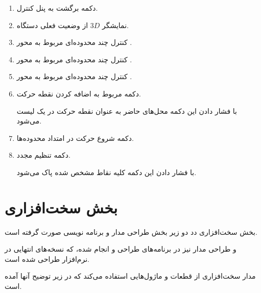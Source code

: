 \documentclass[a4paper,12pt]{report}
\begin{document}
	\begin{enumerate}[nosep]
		\item
			دکمه برگشت به پنل کنترل.
		\item
			نمایشگر
			$3D$
			از وضعیت فعلی دستگاه.
		\item
			کنترل چند محدوده‌ای مربوط به محور
			.

		\item
			کنترل چند محدوده‌ای مربوط به محور
			.

		\item
			کنترل چند محدوده‌ای مربوط به محور
			.

		\item
			دکمه مربوط به اضافه کردن نقطه حرکت.

			با فشار دادن این دکمه محل‌های حاضر به عنوان نقطه حرکت در یک لیست می‌شود.

		\item
			دکمه شروع حرکت در امتداد محدوده‌ها.

		\item
			دکمه تنظیم مجدد.

			با فشار دادن این دکمه کلیه نقاط مشخص شده پاک می‌شود.

	\end{enumerate}

	\section{
	بخش سخت‌افزاری
	}\label{sec3:chap2}

	بخش سخت‌افزاری دد دو زیر بخش طراحی مدار و برنامه نویسی
	صورت گرفته است.

	و طراحی مدار نیز در برنامه‌های طراحی
	و
	انجام شده، که نسخه‌های انتهایی در نرم‌افزار
	طراحی شده است.

	مدار سخت‌افزاری از قطعات و ماژول‌هایی استفاده می‌کند که در زیر توضیح آنها آمده است.
\end{document}
